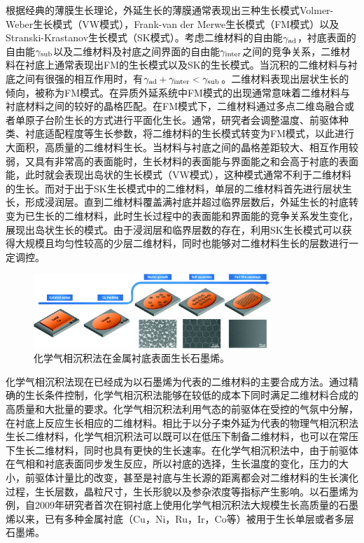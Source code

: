     根据经典的薄膜生长理论，外延生长的薄膜通常表现出三种生长模式\chinesecolon Volmer-Weber生长模式（VW模式），Frank-van der Merwe生长模式（FM模式）以及Stranski-Krastanov生长模式（SK模式）。考虑二维材料的自由能$\gamma_{\rm ad}$，衬底表面的自由能$\gamma_{\rm sub}$以及二维材料及衬底之间界面的自由能$\gamma_{\rm inter}$之间的竞争关系，二维材料在衬底上通常表现出FM的生长模式以及SK的生长模式。当沉积的二维材料与衬底之间有很强的相互作用时，有$\gamma_{\rm ad}+\gamma_{\rm inter}<\gamma_{\rm sub}$。二维材料表现出层状生长的倾向，被称为FM模式。在异质外延系统中FM模式的出现通常意味着二维材料与衬底材料之间的较好的晶格匹配。在FM模式下，二维材料通过多点二维岛融合或者单原子台阶生长的方式进行平面化生长。通常，研究者会调整温度、前驱体种类、衬底适配程度等生长参数，将二维材料的生长模式转变为FM模式，以此进行大面积，高质量的二维材料生长。当材料与衬底之间的晶格差距较大、相互作用较弱，又具有非常高的表面能时，生长材料的表面能与界面能之和会高于衬底的表面能，此时就会表现出岛状的生长模式（VW模式），这种模式通常不利于二维材料的生长。而对于出于SK生长模式中的二维材料，单层的二维材料首先进行层状生长，形成浸润层。直到二维材料覆盖满衬底并超过临界层数后，外延生长的衬底转变为已生长的二维材料，此时生长过程中的表面能和界面能的竞争关系发生变化，展现出岛状生长的模式。由于浸润层和临界层数的存在，利用SK生长模式可以获得大规模且均匀性较高的少层二维材料，同时也能够对二维材料生长的层数进行一定调控。

    \begin{figure}[htb]
        \includegraphics[width=0.8\textwidth]{pic/INTRO_CVD_graphene_growth.png}
        \caption{化学气相沉积法在金属衬底表面生长石墨烯。}
        \label{}
    \end{figure}

    化学气相沉积法现在已经成为以石墨烯为代表的二维材料的主要合成方法。通过精确的生长条件控制，化学气相沉积法能够在较低的成本下同时满足二维材料合成的高质量和大批量的要求。化学气相沉积法利用气态的前驱体在受控的气氛中分解，在衬底上反应生长相应的二维材料。相比于以分子束外延为代表的物理气相沉积法生长二维材料，化学气相沉积法可以既可以在低压下制备二维材料，也可以在常压下生长二维材料，同时也具有更快的生长速率。在化学气相沉积法中，由于前驱体在气相和衬底表面同步发生反应，所以衬底的选择，生长温度的变化，压力的大小，前驱体计量比的改变，甚至是衬底与生长源的距离都会对二维材料的生长演化过程，生长层数，晶粒尺寸，生长形貌以及参杂浓度等指标产生影响。以石墨烯为例，自2009年研究者首次在铜衬底上使用化学气相沉积法大规模生长高质量的石墨烯以来，已有多种金属衬底（Cu，Ni，Ru，Ir，Co等）被用于生长单层或者多层石墨烯。

